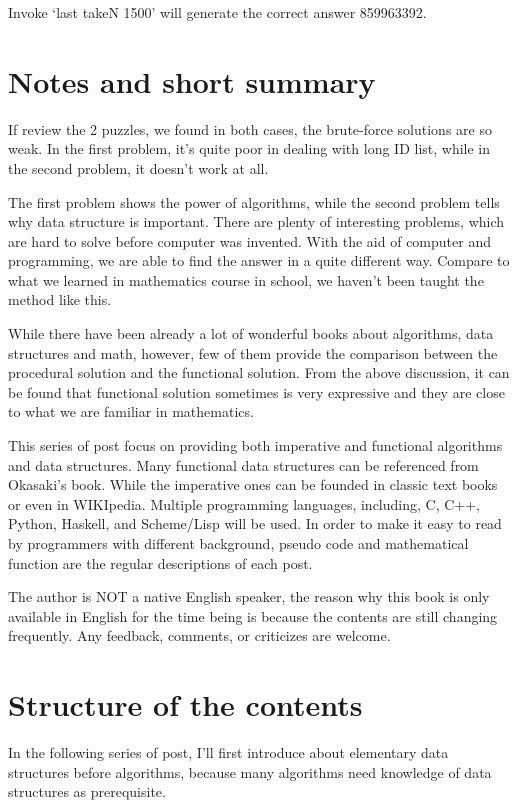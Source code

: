 \documentclass{article}
\begin{document}
Invoke `last takeN 1500' will generate the correct answer 859963392.

\section{Notes and short summary}
If review the 2 puzzles, we found in both cases, the brute-force solutions
are so weak. In the first problem, it's quite poor in dealing with
long ID list, while in the second problem, it doesn't work at all.

The first problem shows the power of algorithms, while the second
problem tells why data structure is important. There are plenty
of interesting problems, which are hard to solve before computer
was invented. With the aid of computer and programming, we are able
to find the answer in a quite different way. Compare to what we
learned in mathematics course in school, we haven't been taught the method
like this.

While there have been already a lot of wonderful books about
algorithms, data structures and math, however, few of them
provide the comparison between the procedural solution and
the functional solution. From the above discussion, it can be
found that functional solution sometimes is very expressive
and they are close to what we are familiar in mathematics.

This series of post focus on providing both imperative and functional
algorithms and data structures. Many functional data structures
can be referenced from Okasaki's book\cite{okasaki-book}. While
the imperative ones can be founded in classic text books \cite{CLRS}
or even in WIKIpedia.
Multiple
programming languages, including, C, C++, Python, Haskell, and
Scheme/Lisp will be used. In order to make it easy to read
by programmers with different background, pseudo code and mathematical
function are the regular descriptions of each post.

The author is NOT a native English speaker, the reason why
this book is only available in English for the time being
is because the contents are still changing frequently. Any
feedback, comments, or criticizes are welcome.

\section{Structure of the contents}
In the following series of post, I'll first introduce about
elementary data structures before algorithms, because many
algorithms need knowledge of data structures as prerequisite.
\end{document}
